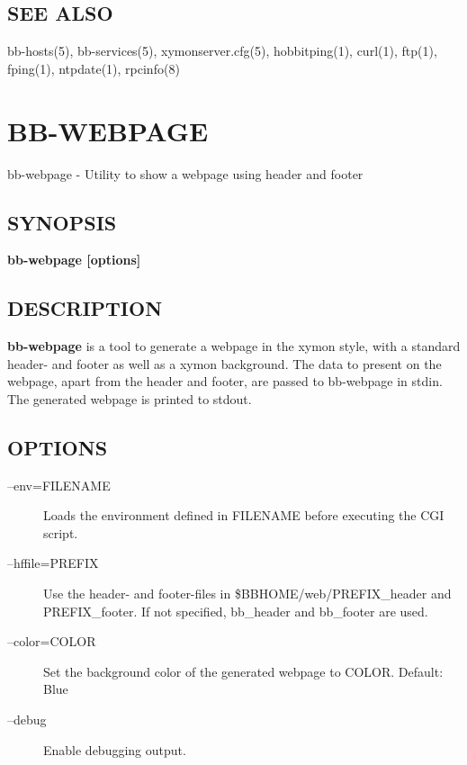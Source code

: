 \subsection{SEE ALSO}
bb-hosts(5), bb-services(5), xymonserver.cfg(5), hobbitping(1), curl(1), ftp(1), fping(1), ntpdate(1), rpcinfo(8) 


%
\newpage
\section{BB-WEBPAGE}
 bb-webpage - Utility to show a webpage using header and footer \
\subsection{SYNOPSIS}
\textbf{bb-webpage [options]}


 
\subsection{DESCRIPTION}
\textbf{bb-webpage} is a tool to generate a webpage in the xymon
style, with a standard header- and footer as well as a xymon
background. The data to present on the webpage, apart from the header
and footer, are passed to bb-webpage in stdin. The generated webpage
is printed to stdout. 


 
\subsection{OPTIONS}
\begin{description}
\item[--env=FILENAME] Loads the environment defined in FILENAME before executing the CGI script. 

 

\item[--hffile=PREFIX] Use the header- and footer-files in
  \$BBHOME/web/PREFIX\_header and PREFIX\_footer. If not specified,
  bb\_header and bb\_footer are used. 


 

\item[--color=COLOR] Set the background color of the generated webpage to COLOR. Default: Blue 

 

\item[--debug] Enable debugging output. 

 
\end{description}
